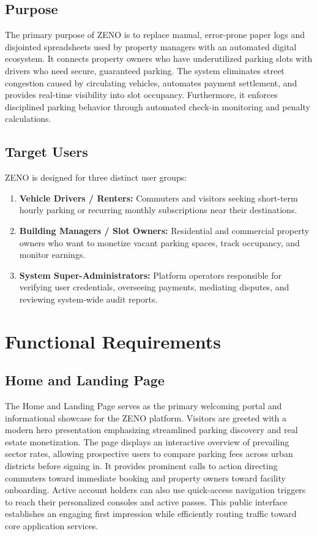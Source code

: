 \documentclass[12pt,a4paper]{article}
\begin{document}
\subsection{Purpose}
The primary purpose of ZENO is to replace manual, error-prone paper logs and disjointed spreadsheets used by property managers with an automated digital ecosystem. It connects property owners who have underutilized parking slots with drivers who need secure, guaranteed parking. The system eliminates street congestion caused by circulating vehicles, automates payment settlement, and provides real-time visibility into slot occupancy. Furthermore, it enforces disciplined parking behavior through automated check-in monitoring and penalty calculations.

\subsection{Target Users}
ZENO is designed for three distinct user groups:
\begin{enumerate}[label=\textbf{\arabic*.}]
    \item \textbf{Vehicle Drivers / Renters:} Commuters and visitors seeking short-term hourly parking or recurring monthly subscriptions near their destinations.
    \item \textbf{Building Managers / Slot Owners:} Residential and commercial property owners who want to monetize vacant parking spaces, track occupancy, and monitor earnings.
    \item \textbf{System Super-Administrators:} Platform operators responsible for verifying user credentials, overseeing payments, mediating disputes, and reviewing system-wide audit reports.
\end{enumerate}

\section{Functional Requirements}

\subsection{Home and Landing Page}
The Home and Landing Page serves as the primary welcoming portal and informational showcase for the ZENO platform. Visitors are greeted with a modern hero presentation emphasizing streamlined parking discovery and real estate monetization. The page displays an interactive overview of prevailing sector rates, allowing prospective users to compare parking fees across urban districts before signing in. It provides prominent calls to action directing commuters toward immediate booking and property owners toward facility onboarding. Active account holders can also use quick-access navigation triggers to reach their personalized consoles and active passes. This public interface establishes an engaging first impression while efficiently routing traffic toward core application services.
\end{document}
